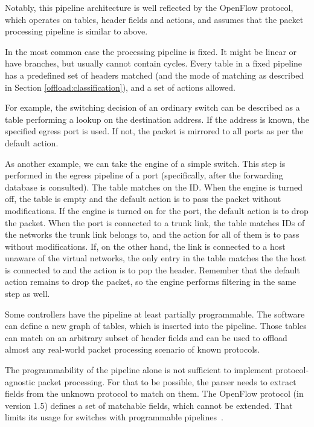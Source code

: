 Notably, this pipeline architecture is well reflected by the OpenFlow protocol,
which operates on tables, header fields and actions, and
assumes that the packet processing pipeline is similar to above.

In the most common case the processing pipeline is fixed. It might be
linear or have branches, but usually cannot contain cycles. Every table in
a fixed pipeline has a predefined set of headers matched (and the mode of
matching as described in Section \ref{offload:classification}), and a set of actions allowed.

For example, the switching decision of an ordinary switch can be described as a table
performing a lookup on the destination  address. If the address is known,
the specified egress port is used. If not, the packet is mirrored to all
ports as per the default action.

As another example, we can take the  engine of a simple switch. This step
is performed in the egress pipeline of a port (specifically, after the forwarding database
is consulted). The table matches on the  ID. When the engine is turned
off, the table is empty and the default action is to pass the packet without
modifications. If the engine is turned on for the port, the default action is
to drop the packet. When the port is connected to a trunk link, the table matches
 IDs of the networks the trunk link belongs to, and the action for
all of them is to pass without modifications. If, on the other hand, the link is
connected to a host unaware of the virtual networks, the only entry in the table
matches the  the host is connected to and the action is to pop the 
header. Remember that the default action remains to drop the packet, so the
engine performs filtering in the same step as well.

Some controllers have the pipeline at least partially programmable.
The software can define a new graph of tables, which is inserted into the
pipeline. Those tables can match on an arbitrary subset of header fields and can be
used to offload almost any real-world packet processing scenario of known
protocols.

The programmability of the pipeline alone is not sufficient to implement
protocol-agnostic packet processing. For that to be possible, the parser needs
to extract fields from the unknown protocol to match on them. The OpenFlow
protocol (in version 1.5) defines a set of matchable fields, which
cannot be extended. That limits its usage for switches with programmable
pipelines~\cite{openflow}.

